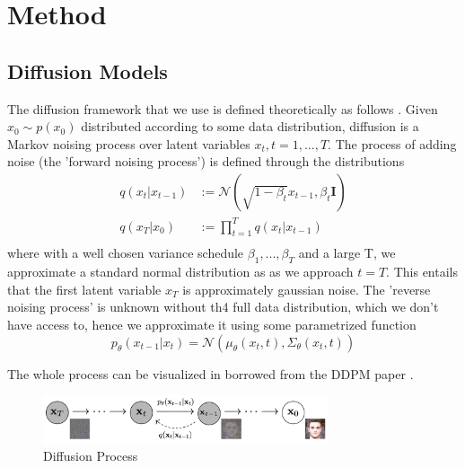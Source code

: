 \section{Method}

\subsection{Diffusion Models}
\label{sec:diffusion_models}
The diffusion framework that we use is defined theoretically as follows \cite{ddpm,improved_diffusion,EDGE}. Given $x_0 \sim p(x_0)$ distributed according to some data distribution, diffusion is a Markov noising process over latent variables $x_t, t=1,...,T$. The process of adding noise (the 'forward noising process') is defined through the distributions
\begin{equation}
    \begin{aligned}
        q(x_t|x_{t-1}) &:= \mathcal{N}(\sqrt{1-\beta_t} x_{t-1}, \beta_t \mathbf{I}) \\
        q(x_T | x_0) &:= \prod_{t=1}^T q(x_t | x_{t-1}) \\
    \end{aligned}
\end{equation}
where with a well chosen variance schedule $\beta_1, ..., \beta_T$ and a large T, we approximate a standard normal distribution as as we approach $t=T$. This entails that the first latent variable $x_T$ is approximately gaussian noise. The 'reverse noising process' is unknown without th4 full data distribution, which we don't have access to, hence we approximate it using some parametrized function
\begin{equation}
    \label{eq:reverse_noising_mean_variance}
    p_{\theta}(x_{t-1} | x_t) = \mathcal{N}(\mu_{\theta}(x_t, t), \Sigma_{\theta}(x_t, t))
\end{equation}

The whole process can be visualized in  borrowed from the DDPM paper \cite{ddpm}.

\begin{figure}[!ht]
    \centering
    \includegraphics[width=0.75\textwidth]{Figures/diffusion/diffusion_process.png}
    \caption{Diffusion Process}
    \label{fig:diffusion_process}
\end{figure}

